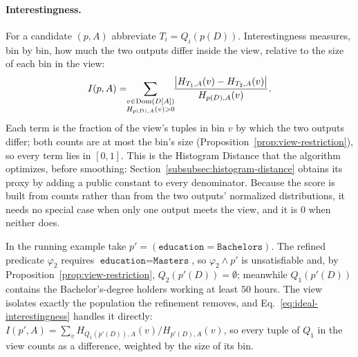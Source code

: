 \paragraph{Interestingness.}
For a candidate $(p,A)$ abbreviate $T_i=Q_i(p(D))$.
Interestingness measures, bin by bin, how much the two outputs differ inside the view, relative to the size of each bin in the view:
\begin{equation}
I(p,A)=\!\!\sum_{\substack{v\in\operatorname{Dom}(D[A])\\ H_{p(D),A}(v)>0}}\!\!
\frac{\big|H_{T_1,A}(v)-H_{T_2,A}(v)\big|}{H_{p(D),A}(v)} .
\label{eq:ideal-interestingness}
\end{equation}
Each term is the fraction of the view's tuples in bin $v$ by which the two outputs differ; both counts are at most the bin's size (Proposition~\ref{prop:view-restriction}), so every term lies in $[0,1]$.
This is the Histogram Distance that the algorithm optimizes, before smoothing: Section~\ref{subsubsec:histogram-distance} obtains its proxy by adding a public constant to every denominator.
Because the score is built from counts rather than from the two outputs' normalized distributions, it needs no special case when only one output meets the view, and it is $0$ when neither does.

\begin{example}
\label{ex:one-sided}
In the running example take $p'=(\texttt{education}=\texttt{Bachelors})$.
The refined predicate $\varphi_2$ requires $\texttt{education}=\texttt{Masters}$, so $\varphi_2\wedge p'$ is unsatisfiable and, by Proposition~\ref{prop:view-restriction}, $Q_2(p'(D))=\emptyset$; meanwhile $Q_1(p'(D))$ contains the Bachelor's-degree holders working at least $50$ hours.
The view isolates exactly the population the refinement removes, and Eq.~\eqref{eq:ideal-interestingness} handles it directly: $I(p',A)=\sum_v H_{Q_1(p'(D)),A}(v)/H_{p'(D),A}(v)$, so every tuple of $Q_1$ in the view counts as a difference, weighted by the size of its bin.
\end{example}

